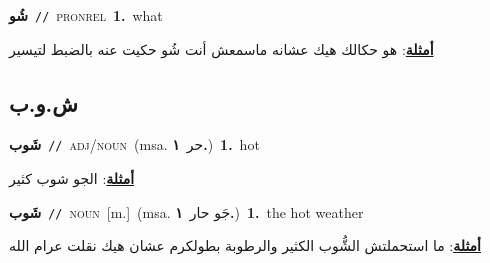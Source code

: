 \documentclass[10pt,a4paper,twoside]{article} %
\begin{document}
\begin{multicols}{2}
{\setlength\topsep{0pt}\textbf{\foreignlanguage{arabic}{شُو}}\ {\color{gray}\texttt{//}\color{black}}\ \textsc{pron\textunderscore rel}\ \textbf{1.}~what\  \begin{flushright}\color{gray}\foreignlanguage{arabic}{\textbf{\underline{\foreignlanguage{arabic}{أمثلة}}}: هو حكالك هيك عشانه ماسمعش أنت شُو حكيت عنه بالضبط لتيسير}\end{flushright}\color{black}} \vspace{2mm}

\vspace{-3mm}
\subsection*{\color{blue}\foreignlanguage{arabic}{ش.و.ب}\color{blue}{}} 

{\setlength\topsep{0pt}\textbf{\foreignlanguage{arabic}{شَوب}}\ {\color{gray}\texttt{//}\color{black}}\ \textsc{adj/noun}\ \color{gray}(msa. \foreignlanguage{arabic}{حر}~\foreignlanguage{arabic}{\textbf{١.}})\color{black}\ \textbf{1.}~hot\  \begin{flushright}\color{gray}\foreignlanguage{arabic}{\textbf{\underline{\foreignlanguage{arabic}{أمثلة}}}: الجو شوب كثير}\end{flushright}\color{black}} \vspace{2mm}

{\setlength\topsep{0pt}\textbf{\foreignlanguage{arabic}{شَوب}}\ {\color{gray}\texttt{//}\color{black}}\ \textsc{noun}\ [m.]\ \color{gray}(msa. \foreignlanguage{arabic}{جَو حار}~\foreignlanguage{arabic}{\textbf{١.}})\color{black}\ \textbf{1.}~the hot weather\  \begin{flushright}\color{gray}\foreignlanguage{arabic}{\textbf{\underline{\foreignlanguage{arabic}{أمثلة}}}: ما استحملتش الشُّوب الكثير والرطوبة بطولكرم عشان هيك نقلت عرام الله}\end{flushright}\color{black}} \vspace{2mm}


\end{multicols}
\end{document}

